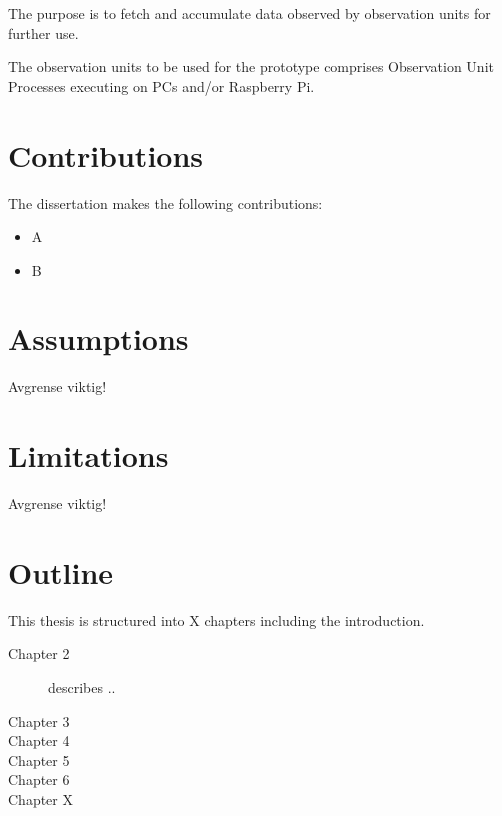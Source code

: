 \documentclass[USenglish]{uit-thesis}
\begin{document}
The purpose is to fetch and accumulate data observed by observation units for further use.

The observation units to be used for the prototype comprises
Observation Unit Processes executing on PCs and/or Raspberry Pi.


\section{Contributions}
The dissertation makes the following contributions:
\begin{itemize}
\item A
\item B
\end{itemize}

\section{Assumptions}
Avgrense viktig!

\section{Limitations}
Avgrense viktig!

\section{Outline}
This thesis is structured into X chapters including the introduction.

\begin{description}
\item[Chapter 2] describes ..
\item[Chapter 3]
\item[Chapter 4]
\item[Chapter 5]
\item[Chapter 6]
\item[Chapter X]
\end{description}


\end{document}
